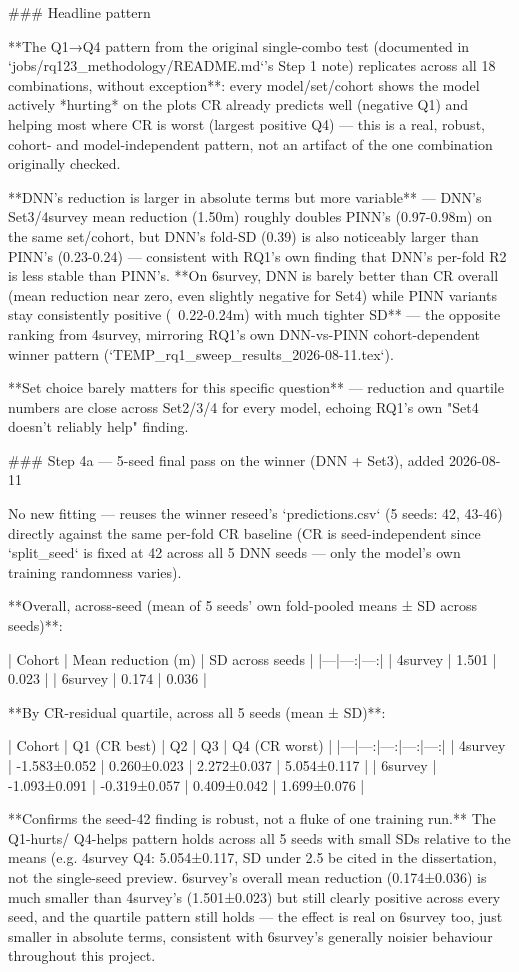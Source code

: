 ### Headline pattern

**The Q1→Q4 pattern from the original single-combo test (documented in
`jobs/rq123_methodology/README.md`'s Step 1 note) replicates across all 18 combinations,
without exception**: every model/set/cohort shows the model actively *hurting* on the plots CR
already predicts well (negative Q1) and helping most where CR is worst (largest positive Q4) —
this is a real, robust, cohort- and model-independent pattern, not an artifact of the one
combination originally checked.

**DNN's reduction is larger in absolute terms but more variable** — DNN's Set3/4survey mean
reduction (1.50m) roughly doubles PINN's (0.97-0.98m) on the same set/cohort, but DNN's fold-SD
(0.39) is also noticeably larger than PINN's (0.23-0.24) — consistent with RQ1's own finding that
DNN's per-fold R2 is less stable than PINN's. **On 6survey, DNN is barely better than CR overall
(mean reduction near zero, even slightly negative for Set4) while PINN variants stay
consistently positive (~0.22-0.24m) with much tighter SD** — the opposite ranking from 4survey,
mirroring RQ1's own DNN-vs-PINN cohort-dependent winner pattern
(`TEMP_rq1_sweep_results_2026-08-11.tex`).

**Set choice barely matters for this specific question** — reduction and quartile numbers are
close across Set2/3/4 for every model, echoing RQ1's own "Set4 doesn't reliably help" finding.

### Step 4a — 5-seed final pass on the winner (DNN + Set3), added 2026-08-11

No new fitting — reuses the winner reseed's `predictions.csv` (5 seeds: 42, 43-46) directly
against the same per-fold CR baseline (CR is seed-independent since `split_seed` is fixed at 42
across all 5 DNN seeds — only the model's own training randomness varies).

**Overall, across-seed (mean of 5 seeds' own fold-pooled means ± SD across seeds)**:

| Cohort | Mean reduction (m) | SD across seeds |
|---|---:|---:|
| 4survey | 1.501 | 0.023 |
| 6survey | 0.174 | 0.036 |

**By CR-residual quartile, across all 5 seeds (mean ± SD)**:

| Cohort | Q1 (CR best) | Q2 | Q3 | Q4 (CR worst) |
|---|---:|---:|---:|---:|
| 4survey | -1.583±0.052 | 0.260±0.023 | 2.272±0.037 | 5.054±0.117 |
| 6survey | -1.093±0.091 | -0.319±0.057 | 0.409±0.042 | 1.699±0.076 |

**Confirms the seed-42 finding is robust, not a fluke of one training run.** The Q1-hurts/
Q4-helps pattern holds across all 5 seeds with small SDs relative to the means (e.g. 4survey Q4:
5.054±0.117, SD under 2.5%
be cited in the dissertation, not the single-seed preview. 6survey's overall mean reduction
(0.174±0.036) is much smaller than 4survey's (1.501±0.023) but still clearly positive across
every seed, and the quartile pattern still holds — the effect is real on 6survey too, just
smaller in absolute terms, consistent with 6survey's generally noisier behaviour throughout this
project.

